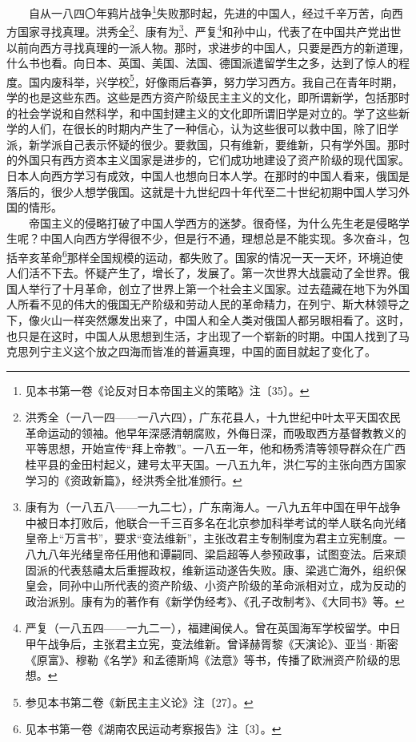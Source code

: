 \documentclass[cn,11pt,chinese]{elegantbook}
\begin{document}
　　自从一八四〇年鸦片战争\footnote[2]{ 见本书第一卷《论反对日本帝国主义的策略》注〔35〕。}失败那时起，先进的中国人，经过千辛万苦，向西方国家寻找真理。洪秀全\footnote[3]{ 洪秀全（一八一四——一八六四），广东花县人，十九世纪中叶太平天国农民革命运动的领袖。他早年深感清朝腐败，外侮日深，而吸取西方基督教教义的平等思想，开始宣传“拜上帝教”。一八五一年，他和杨秀清等领导群众在广西桂平县的金田村起义，建号太平天国。一八五九年，洪仁写的主张向西方国家学习的《资政新篇》，经洪秀全批准颁行。}、康有为\footnote[4]{ 康有为（一八五八——一九二七），广东南海人。一八九五年中国在甲午战争中被日本打败后，他联合一千三百多名在北京参加科举考试的举人联名向光绪皇帝上“万言书”，要求“变法维新”，主张改君主专制制度为君主立宪制度。一八九八年光绪皇帝任用他和谭嗣同、梁启超等人参预政事，试图变法。后来顽固派的代表慈禧太后重握政权，维新运动遂告失败。康、梁逃亡海外，组织保皇会，同孙中山所代表的资产阶级、小资产阶级的革命派相对立，成为反动的政治派别。康有为的著作有《新学伪经考》、《孔子改制考》、《大同书》等。}、严复\footnote[5]{ 严复（一八五四——一九二一），福建闽侯人。曾在英国海军学校留学。中日甲午战争后，主张君主立宪，变法维新。曾译赫胥黎《天演论》、亚当·斯密《原富》、穆勒《名学》和孟德斯鸠《法意》等书，传播了欧洲资产阶级的思想。}和孙中山，代表了在中国共产党出世以前向西方寻找真理的一派人物。那时，求进步的中国人，只要是西方的新道理，什么书也看。向日本、英国、美国、法国、德国派遣留学生之多，达到了惊人的程度。国内废科举，兴学校\footnote[6]{ 参见本书第二卷《新民主主义论》注〔27〕。}，好像雨后春笋，努力学习西方。我自己在青年时期，学的也是这些东西。这些是西方资产阶级民主主义的文化，即所谓新学，包括那时的社会学说和自然科学，和中国封建主义的文化即所谓旧学是对立的。学了这些新学的人们，在很长的时期内产生了一种信心，认为这些很可以救中国，除了旧学派，新学派自己表示怀疑的很少。要救国，只有维新，要维新，只有学外国。那时的外国只有西方资本主义国家是进步的，它们成功地建设了资产阶级的现代国家。日本人向西方学习有成效，中国人也想向日本人学。在那时的中国人看来，俄国是落后的，很少人想学俄国。这就是十九世纪四十年代至二十世纪初期中国人学习外国的情形。\\
　　帝国主义的侵略打破了中国人学西方的迷梦。很奇怪，为什么先生老是侵略学生呢？中国人向西方学得很不少，但是行不通，理想总是不能实现。多次奋斗，包括辛亥革命\footnote[7]{ 见本书第一卷《湖南农民运动考察报告》注〔3〕。}那样全国规模的运动，都失败了。国家的情况一天一天坏，环境迫使人们活不下去。怀疑产生了，增长了，发展了。第一次世界大战震动了全世界。俄国人举行了十月革命，创立了世界上第一个社会主义国家。过去蕴藏在地下为外国人所看不见的伟大的俄国无产阶级和劳动人民的革命精力，在列宁、斯大林领导之下，像火山一样突然爆发出来了，中国人和全人类对俄国人都另眼相看了。这时，也只是在这时，中国人从思想到生活，才出现了一个崭新的时期。中国人找到了马克思列宁主义这个放之四海而皆准的普遍真理，中国的面目就起了变化了。\\
\end{document}
